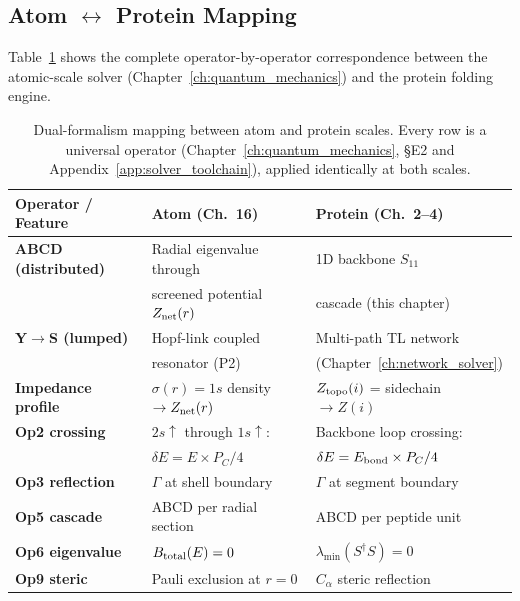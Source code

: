 \subsection{Atom $\leftrightarrow$ Protein Mapping}

Table~\ref{tab:dual_formalism} shows the complete
operator-by-operator correspondence between the
atomic-scale solver (Chapter~\ref{ch:quantum_mechanics})
and the protein folding engine.

\begin{table}[H]
\centering
\small
\caption{Dual-formalism mapping between atom and protein
scales.  Every row is a universal operator
(Chapter~\ref{ch:quantum_mechanics}, \S E2 and
Appendix~\ref{app:solver_toolchain}), applied
identically at both scales.}
\label{tab:dual_formalism}
\renewcommand{\arraystretch}{1.3}
\begin{tabular}{@{}l l l@{}}
\toprule
\textbf{Operator / Feature}
    & \textbf{Atom (Ch.~16)}
    & \textbf{Protein (Ch.~2--4)} \\
\midrule
\textbf{ABCD (distributed)} &
    Radial eigenvalue through &
    1D backbone $S_{11}$ \\
    & screened potential $Z_{\rm net}(r)$ &
    cascade (this chapter) \\[3pt]
\textbf{Y$\to$S (lumped)} &
    Hopf-link coupled &
    Multi-path TL network \\
    & resonator (P2) &
    (Chapter~\ref{ch:network_solver}) \\[3pt]
\textbf{Impedance profile} &
    $\sigma(r) = 1s$ density $\to Z_{\rm net}(r)$ &
    $Z_{\rm topo}(i)$ = sidechain $\to Z(i)$ \\[3pt]
\textbf{Op2 crossing} &
    $2s{\uparrow}$ through $1s{\uparrow}$: &
    Backbone loop crossing: \\
    & $\delta E = E \times P_C/4$ &
    $\delta E = E_{\rm bond} \times P_C/4$ \\[3pt]
\textbf{Op3 reflection} &
    $\Gamma$ at shell boundary &
    $\Gamma$ at segment boundary \\[3pt]
\textbf{Op5 cascade} &
    ABCD per radial section &
    ABCD per peptide unit \\[3pt]
\textbf{Op6 eigenvalue} &
    $B_{\rm total}(E) = 0$ &
    $\lambda_{\min}(S^\dagger S) = 0$ \\[3pt]
\textbf{Op9 steric} &
    Pauli exclusion at $r = 0$ &
    $C_\alpha$ steric reflection \\
\bottomrule
\end{tabular}
\end{table}

